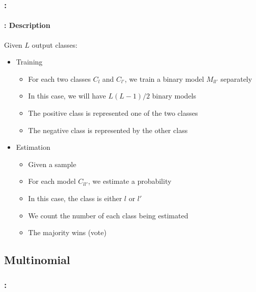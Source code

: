 \documentclass[xcolor=table]{beamer}
\begin{document}
\begin{frame}
	\frametitle{\insertshortsubtitle: \insertsection}
	\framesubtitle{\insertsubsection: Description}
	
	Given $L$ output classes:
	\begin{itemize}
		\item Training
		\begin{itemize}
			\item For each two classes $C_{l}$ and $C_{l'}$, we train a binary model $M_{ll'}$ separately
			\item In this case, we will have $L (L-1)/2$ binary models
			\item The positive class is represented one of the two classes
			\item The negative class is represented by the other class
		\end{itemize}
		\item Estimation
		\begin{itemize}
			\item Given a sample
			\item For each model $C_{ll'}$, we estimate a probability
			\item In this case, the class is either $l$ or $l'$
			\item We count the number of each class being estimated
			\item The majority wins (vote)
		\end{itemize}
	\end{itemize}
	
\end{frame}

\subsection{Multinomial}

\begin{frame}
	\frametitle{\insertshortsubtitle: \insertsection}
	\framesubtitle{\insertsubsection}
	
	\begin{center}
	\end{center}
	
\end{frame}
\end{document}
